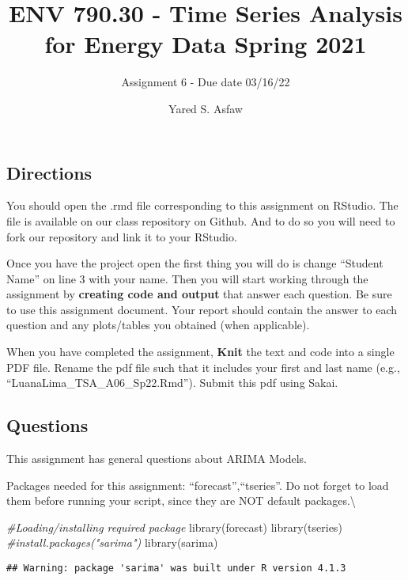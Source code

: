 \documentclass[
]{article}
\title{ENV 790.30 - Time Series Analysis for Energy Data \textbar{}
Spring 2021}
\subtitle{Assignment 6 - Due date 03/16/22}
\author{Yared S. Asfaw}
\date{}
\newenvironment{Shaded}{\begin{snugshade}}{\end{snugshade}}
\newcommand{\CommentTok}[1]{\textcolor[rgb]{0.56,0.35,0.01}{\textit{#1}}}
\newcommand{\FunctionTok}[1]{\textcolor[rgb]{0.00,0.00,0.00}{#1}}
\newcommand{\NormalTok}[1]{#1}
\begin{document}
\maketitle

\hypertarget{directions}{%
\subsection{Directions}\label{directions}}

You should open the .rmd file corresponding to this assignment on
RStudio. The file is available on our class repository on Github. And to
do so you will need to fork our repository and link it to your RStudio.

Once you have the project open the first thing you will do is change
``Student Name'' on line 3 with your name. Then you will start working
through the assignment by \textbf{creating code and output} that answer
each question. Be sure to use this assignment document. Your report
should contain the answer to each question and any plots/tables you
obtained (when applicable).

When you have completed the assignment, \textbf{Knit} the text and code
into a single PDF file. Rename the pdf file such that it includes your
first and last name (e.g., ``LuanaLima\_TSA\_A06\_Sp22.Rmd''). Submit
this pdf using Sakai.

\hypertarget{questions}{%
\subsection{Questions}\label{questions}}

This assignment has general questions about ARIMA Models.

Packages needed for this assignment: ``forecast'',``tseries''. Do not
forget to load them before running your script, since they are NOT
default packages.\textbackslash{}

\begin{Shaded}
\begin{Highlighting}[]
\CommentTok{\#Loading/installing required package }
\FunctionTok{library}\NormalTok{(forecast)}
\FunctionTok{library}\NormalTok{(tseries)}
\CommentTok{\#install.packages("sarima")}
\FunctionTok{library}\NormalTok{(sarima)}
\end{Highlighting}
\end{Shaded}

\begin{verbatim}
## Warning: package 'sarima' was built under R version 4.1.3
\end{verbatim}
\end{document}
